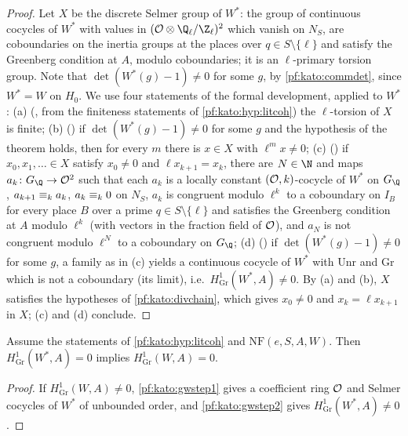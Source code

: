 \begin{proof}
Let $X$ be the discrete Selmer group of $W^*$: the group of continuous cocycles of $W^*$ with values in $(\katoO\otimes\Q_\ell/\Z_\ell)^2$
which vanish on $N_S$, are coboundaries on the inertia groups at the places over $q\in S\setminus\{\ell\}$ and satisfy the Greenberg
condition at $A$, modulo coboundaries; it is an $\ell$-primary torsion group. Note that $\det(W^*(g)-1)\ne0$ for some $g$, by
\cref{pf:kato:commdet}, since $W^*=W$ on $H_0$. We use four statements of the formal development, applied to $W^*$:
(a) (, from the finiteness statements of \cref{pf:kato:hyp:litcoh})
the $\ell$-torsion of $X$ is finite;
(b) () if $\det(W^*(g)-1)\ne0$ for some $g$ and the hypothesis of the theorem
holds, then for every $m$ there is $x\in X$ with $\ell^mx\ne0$;
(c) () if $x_0,x_1,\ldots\in X$ satisfy $x_0\ne0$ and
$\ell x_{k+1}=x_k$, there are $N\in\N$ and maps $a_k\colon G_\Q\to\katoO^2$ such that each $a_k$ is a locally constant $(\mathcal{O},k)$-cocycle of
$W^*$ on $G_\Q$, $a_{k+1}\equiv_{k}a_k$, $a_k\equiv_{k}0$ on $N_S$, $a_k$ is congruent modulo $\ell^k$ to a coboundary on $I_B$ for every
place $B$ over a prime $q\in S\setminus\{\ell\}$ and satisfies the Greenberg condition at $A$ modulo $\ell^k$ (with vectors in the fraction
field of $\mathcal{O}$), and $a_N$ is not congruent modulo $\ell^N$ to a coboundary on $G_\Q$;
(d) () if $\det(W^*(g)-1)\ne0$ for some $g$, a family as in (c)
yields a continuous cocycle of $W^*$ with $\mathrm{Unr}$ and $\mathrm{Gr}$ which is not a coboundary (its limit), i.e.\
$H^1_{\mathrm{Gr}}(W^*,A)\ne0$.
By (a) and (b), $X$ satisfies the hypotheses of \cref{pf:kato:divchain}, which gives $x_0\ne0$ and $x_k=\ell x_{k+1}$ in $X$; (c) and (d)
conclude.
\end{proof}

\begin{theorem}\label{pf:kato:gw}
Assume the statements of \cref{pf:kato:hyp:litcoh} and $\mathrm{NF}(e,S,A,W)$. Then $H^1_{\mathrm{Gr}}(W^*,A)=0$ implies $H^1_{\mathrm{Gr}}(W,A)=0$.
\formallabel{GlobalTheory.Ord2.grZero_of_grZero_dual1}
\end{theorem}

\begin{proof}
If $H^1_{\mathrm{Gr}}(W,A)\ne0$, \cref{pf:kato:gwstep1} gives a coefficient ring $\mathcal{O}$ and Selmer cocycles of $W^*$ of unbounded order,
and \cref{pf:kato:gwstep2} gives $H^1_{\mathrm{Gr}}(W^*,A)\ne0$.
\end{proof}

